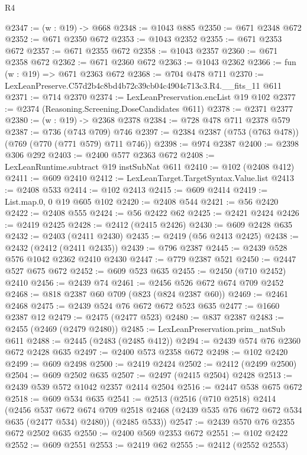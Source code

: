 \begin{lexlean}{R4}
\begin{coremodule}
@2347 := (w : @19) -> @668
@2348 := @1043 @885
@2350 := @671 @2348 @672
@2352 := @671 @2350 @672
@2353 := @1043 @2352
@2355 := @671 @2353 @672
@2357 := @671 @2355 @672
@2358 := @1043 @2357
@2360 := @671 @2358 @672
@2362 := @671 @2360 @672
@2363 := @1043 @2362
@2366 := fun (w : @19) => @671 @2363 @672
@2368 := @704 @478 @711
@2370 := LexLeanPreserve.C57d2b4c8bd4b72c39cb04c4904c713c3.R4.__fits_11 @611
@2371 := @714 @2370
@2374 := LexLeanPreservation.encList @19 @102
@2377 := @2374 (Reasoning.Screening.DoseCandidates @611)
@2378 := @2371 @2377
@2380 := (w : @19) -> @2368 @2378
@2384 := @728 @478 @711 @2378 @579
@2387 := @736 (@743 @709) @746
@2397 := @2384 @2387 (@753 (@763 @478)) (@769 (@770 (@771 @579) @711 @746))
@2398 := @974 @2387
@2400 := @2398 @306 @292
@2403 := @2400 @577 @2363 @672
@2408 := LexLeanRuntime.subtract @19 instSubNat @611
@2410 := @102 (@2408 @412)
@2411 := @609 @2410
@2412 := LexLeanTarget.TargetSyntax.Value.list
@2413 := @2408 @533
@2414 := @102 @2413
@2415 := @609 @2414
@2419 := List.map.{0, 0} @19 @605 @102
@2420 := @2408 @544
@2421 := @56 @2420
@2422 := @2408 @555
@2424 := @56 @2422 @62
@2425 := @2421 @2424
@2426 := @2419 @2425
@2428 := @2412 (@2415 @2426)
@2430 := @609 @2428 @635
@2432 := @2403 (@2411 @2430)
@2435 := @2419 (@56 @2413 @2425)
@2438 := @2432 (@2412 (@2411 @2435))
@2439 := @796 @2387
@2445 := @2439 @528 @576 @1042 @2362 @2410 @2430
@2447 := @779 @2387 @521
@2450 := @2447 @527 @675 @672
@2452 := @609 @523 @635
@2455 := @2450 (@710 @2452) @2410
@2456 := @2439 @74
@2461 := @2456 @526 @672 @674 @709 @2452
@2468 := @818 @2387 @60 @709 (@823 (@824 @2387 @60))
@2469 := @2461 @2468
@2475 := @2439 @524 @76 @672 @672 @523 @635
@2477 := @1660 @2387 @12
@2479 := @2475 (@2477 @523)
@2480 := @837 @2387
@2483 := @2455 (@2469 (@2479 @2480))
@2485 := LexLeanPreservation.prim_natSub @611
@2488 := @2445 (@2483 (@2485 @412))
@2494 := @2439 @574 @76 @2360 @672 @2428 @635
@2497 := @2400 @573 @2358 @672
@2498 := @102 @2420
@2499 := @609 @2498
@2500 := @2419 @2424
@2502 := @2412 (@2499 @2500)
@2504 := @609 @2502 @635
@2507 := @2497 (@2415 @2504) @2428
@2513 := @2439 @539 @572 @1042 @2357 @2414 @2504
@2516 := @2447 @538 @675 @672
@2518 := @609 @534 @635
@2541 := @2513
    (@2516
      (@710 @2518)
      @2414
      (@2456
        @537
        @672
        @674
        @709
        @2518
        @2468
        (@2439 @535 @76 @672 @672 @534 @635 (@2477 @534) @2480))
      (@2485 @533))
@2547 := @2439 @570 @76 @2355 @672 @2502 @635
@2550 := @2400 @569 @2353 @672
@2551 := @102 @2422
@2552 := @609 @2551
@2553 := @2419 @62
@2555 := @2412 (@2552 @2553)

\end{coremodule}
\end{lexlean}
